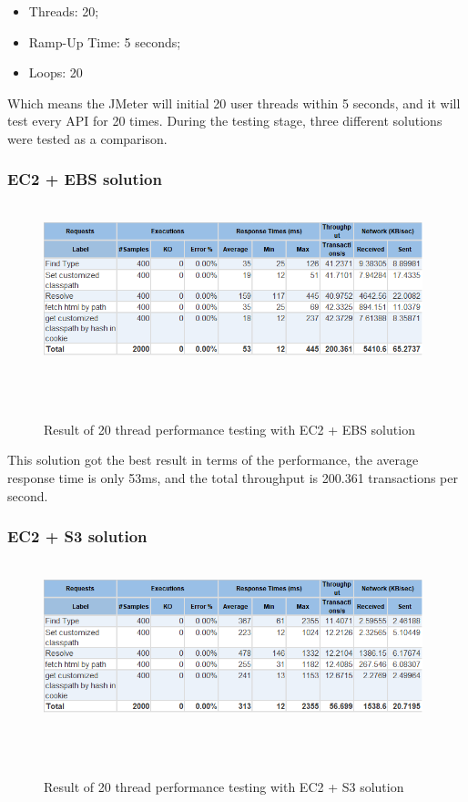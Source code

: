 \documentclass[runningheads]{llncs}
\begin{document}
\begin{itemize}
	\item Threads: 20;
	\item Ramp-Up Time: 5 seconds;
	\item Loops: 20
\end{itemize}

Which means the JMeter will initial 20 user threads within 5 seconds, and it will test every API for 20 times. During the testing stage, three different solutions were tested as a comparison.

\subsubsection{EC2 + EBS solution}

\begin{figure}[H]
    \centering
    \includegraphics[width=11cm]{pic/jmeter-ebs.png}
    \caption{Result of 20 thread performance testing with EC2 + EBS solution}
    \label{Result of 20 thread performance testing with EC2 + EBS solution}
\end{figure}

This solution got the best result in terms of the performance, the average response time is only 53ms, and the total throughput is 200.361 transactions per second.

\subsubsection{EC2 + S3 solution}
\begin{figure}[H]
    \centering
    \includegraphics[width=11cm]{pic/jmeter-s3.png}
    \caption{Result of 20 thread performance testing with EC2 + S3 solution}
    \label{Result of 20 thread performance testing with EC2 + S3 solution}
\end{figure}
\end{document}
